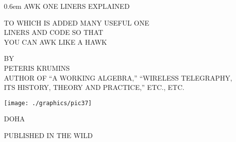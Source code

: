 \documentclass{book}
\begin{document}
\clearpage
\newcommand\nbvspace[1][1]{\vspace*{\stretch{#1}}}

\newcommand\nbstretchyspace{\spaceskip0.5em plus 0.25em minus 0.25em}

\newcommand{\nbtitlestretch}{\spaceskip0.6em}

\newlength{\TmpLen}


\pagestyle{empty}
\begin{center}
\bfseries

\nbvspace[1]
\Huge
{\nbtitlestretch\HUGE
AWK ONE LINERS EXPLAINED}

\nbvspace[1]
\normalsize
TO WHICH IS ADDED MANY USEFUL ONE\\
LINERS AND CODE SO THAT\\
YOU CAN AWK LIKE A HAWK

\nbvspace[1]
\small BY\\
\Large PETERIS KRUMINS\\[0.5em]
\footnotesize AUTHOR OF ``A WORKING ALGEBRA,'' ``WIRELESS TELEGRAPHY,\\
ITS HISTORY, THEORY AND PRACTICE,'' ETC., ETC.

\nbvspace[2]

\texttt{[image: ./graphics/pic37]}

\nbvspace[3]
\normalsize
DOHA

\Large
PUBLISHED IN THE WILD
\nbvspace[1]
\end{center}
\pagestyle{fancy}
\end{document}
